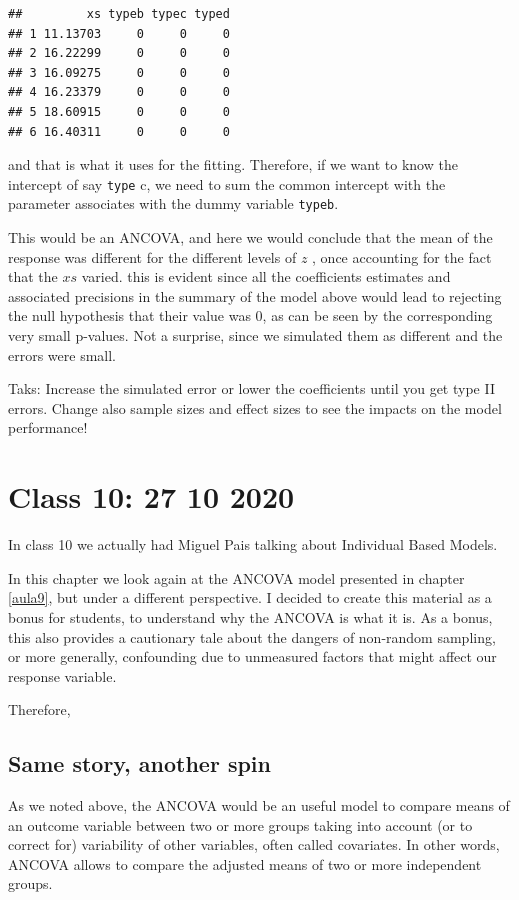 \documentclass[
]{book}
\begin{document}
\begin{verbatim}
##         xs typeb typec typed
## 1 11.13703     0     0     0
## 2 16.22299     0     0     0
## 3 16.09275     0     0     0
## 4 16.23379     0     0     0
## 5 18.60915     0     0     0
## 6 16.40311     0     0     0
\end{verbatim}

and that is what it uses for the fitting. Therefore, if we want to know the intercept of say \texttt{type} c, we need to sum the common intercept with the parameter associates with the dummy variable \texttt{typeb}.

This would be an ANCOVA, and here we would conclude that the mean of the response was different for the different levels of \(z\) , once accounting for the fact that the \(xs\) varied. this is evident since all the coefficients estimates and associated precisions in the summary of the model above would lead to rejecting the null hypothesis that their value was 0, as can be seen by the corresponding very small p-values. Not a surprise, since we simulated them as different and the errors were small.

Taks: Increase the simulated error or lower the coefficients until you get type II errors. Change also sample sizes and effect sizes to see the impacts on the model performance!

\hypertarget{aula10}{%
\chapter{Class 10: 27 10 2020}\label{aula10}}

In class 10 we actually had Miguel Pais talking about Individual Based Models.

In this chapter we look again at the ANCOVA model presented in chapter \ref{aula9}, but under a different perspective. I decided to create this material as a bonus for students, to understand why the ANCOVA is what it is. As a bonus, this also provides a cautionary tale about the dangers of non-random sampling, or more generally, confounding due to unmeasured factors that might affect our response variable.

Therefore,

\hypertarget{same-story-another-spin}{%
\section{Same story, another spin}\label{same-story-another-spin}}

As we noted above, the ANCOVA would be an useful model to compare means of an outcome variable between two or more groups taking into account (or to correct for) variability of other variables, often called covariates. In other words, ANCOVA allows to compare the adjusted means of two or more independent groups.
\end{document}
